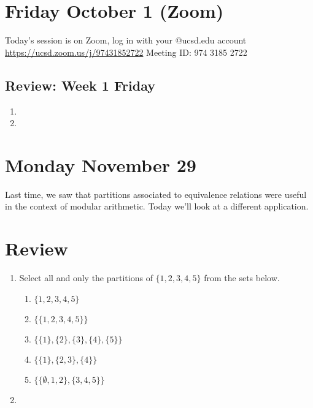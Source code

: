 \documentclass[12pt, oneside]{article}
\begin{document}
\section*{Friday October 1 (Zoom)}

Today's session is on Zoom, log in with your @ucsd.edu account \url{https://ucsd.zoom.us/j/97431852722} Meeting ID: 974 3185 2722



\vfill
\newpage




\newpage


\newpage
\subsection*{Review: Week 1 Friday}
\begin{enumerate}
    \item {}
    \item {}
\end{enumerate}

\section*{Monday November 29}


Last time, we saw that partitions associated to equivalence relations
were useful in the context of modular arithmetic.
Today we'll look at a different application.


\newpage
\section*{Review}
\begin{enumerate}
    \item Select all and only the partitions of $\{1,2,3,4,5\}$ from the sets below.
    \begin{enumerate}
    \item $\{1,2,3,4,5\}$
    \item $\{\{1,2,3,4,5\}\}$
    \item $\{\{1\},\{2\},\{3\},\{4\},\{5\}\}$
    \item $\{ \{1\}, \{2,3\}, \{4\} \}$
    \item $\{ \{\emptyset, 1, 2\}, \{3,4,5\}\}$
    \end{enumerate}
    \item \hspace{1in}\\ 
\end{enumerate}
\newpage
\end{document}
